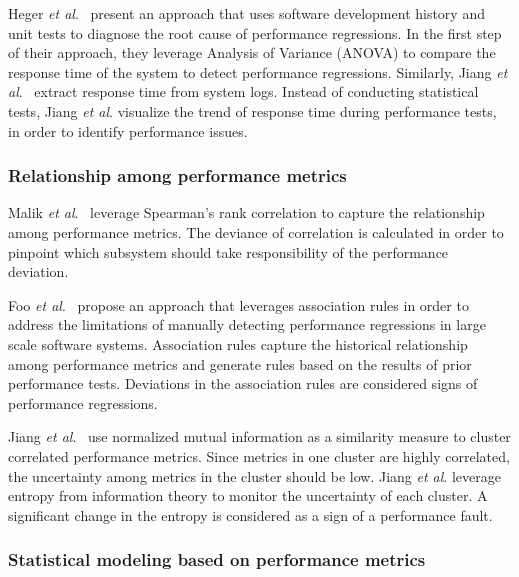 \documentclass[smallextended]{svjour3}       %
\begin{document}
Heger \emph{et al$.$}~\cite{DBLP:conf/wosp/HegerHF13} present an approach that uses software development history and unit tests to diagnose the root cause of performance regressions. In the first step of their approach, they leverage Analysis of Variance (ANOVA) to compare the response time of the system to detect performance regressions. Similarly, Jiang \emph{et al$.$}~\cite{jackicsm2009} extract response time from system logs. Instead of conducting statistical tests, Jiang \emph{et al$.$} visualize the trend of response time during performance tests, in order to identify performance issues.


\subsubsection{Relationship among performance metrics}
\label{sec:relatedrelation}

Malik \emph{et al$.$}~\cite{5635038} leverage Spearman's rank correlation to capture the relationship among performance metrics. The deviance of correlation is calculated in order to pinpoint which subsystem should take responsibility of the performance deviation.

Foo\emph{ et al$.$}~\cite{foo2010mining} propose an approach that leverages association rules in order to address the limitations of manually detecting performance regressions in large scale software systems. Association rules capture the historical relationship among performance metrics and generate rules based on the results of prior performance tests. Deviations in the association rules are considered signs of performance regressions.

Jiang \emph{et al$.$}~\cite{5270324} use normalized mutual information as a similarity measure to cluster correlated performance metrics. Since metrics in one cluster are highly correlated, the uncertainty among metrics in the cluster should be low. Jiang \emph{et al$.$} leverage entropy from information theory to monitor the uncertainty of each cluster. A significant change in the entropy is considered as a sign of a performance fault. 

\subsubsection{Statistical modeling based on performance metrics}
\label{sec:relatedmodel}
\end{document}
